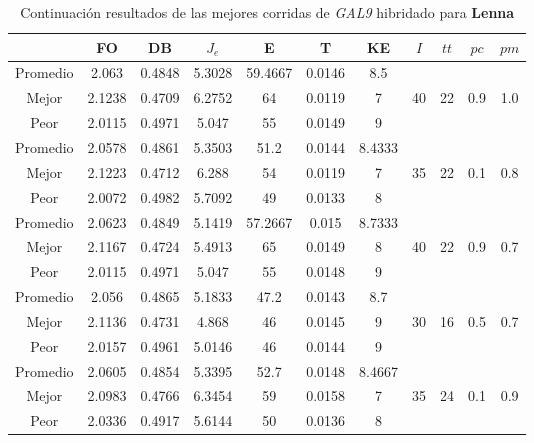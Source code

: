 \begin{table}[h!]
    \footnotesize
    \begin{center}
        \begin{tabular}{|c|c|c|c|c|c|c|c|c|c|c|}
        \hline
             & {\bf FO} & {\bf DB} & $J_e$ & {\bf E} & {\bf T} & {\bf KE} & $I$ & $tt$ & $pc$ & $pm$ \\
        \hline
        \hline
            Promedio  & 2.063 & 0.4848 & 5.3028 & 59.4667 & 0.0146 & 8.5 &  &  &  & \\
            \cline{1-7}
            Mejor & 2.1238 & 0.4709  & 6.2752 & 64 & 0.0119 & 7 & 40 & 22 & 0.9 & 1.0\\
            \cline{1-7}
            Peor & 2.0115 & 0.4971  & 5.047 & 55 & 0.0149 & 9 &  &  &  & \\
        \hline
        \hline
            Promedio  & 2.0578 & 0.4861 & 5.3503 & 51.2 & 0.0144 & 8.4333 &  &  &  & \\
            \cline{1-7}
            Mejor & 2.1223 & 0.4712  & 6.288 & 54 & 0.0119 & 7 & 35 & 22 & 0.1 & 0.8\\
            \cline{1-7}
            Peor & 2.0072 & 0.4982  & 5.7092 & 49 & 0.0133 & 8 &  &  &  & \\
        \hline
        \hline
            Promedio  & 2.0623 & 0.4849 & 5.1419 & 57.2667 & 0.015 & 8.7333 &  &  &  & \\
            \cline{1-7}
            Mejor & 2.1167 & 0.4724  & 5.4913 & 65 & 0.0149 & 8 & 40 & 22 & 0.9 & 0.7\\
            \cline{1-7}
            Peor & 2.0115 & 0.4971  & 5.047 & 55 & 0.0148 & 9 &  &  &  & \\
        \hline
        \hline
            Promedio  & 2.056 & 0.4865 & 5.1833 & 47.2 & 0.0143 & 8.7 &  &  &  & \\
            \cline{1-7}
            Mejor & 2.1136 & 0.4731  & 4.868 & 46 & 0.0145 & 9 & 30 & 16 & 0.5 & 0.7\\
            \cline{1-7}
            Peor & 2.0157 & 0.4961  & 5.0146 & 46 & 0.0144 & 9 &  &  &  & \\
        \hline
        \hline
            Promedio  & 2.0605 & 0.4854 & 5.3395 & 52.7 & 0.0148 & 8.4667 &  &  &  & \\
            \cline{1-7}
            Mejor & 2.0983 & 0.4766  & 6.3454 & 59 & 0.0158 & 7 & 35 & 24 & 0.1 & 0.9\\
            \cline{1-7}
            Peor & 2.0336 & 0.4917  & 5.6144 & 50 & 0.0136 & 8 &  &  &  & \\
        \hline
        \end{tabular}
        \caption{Continuaci\'on resultados de las mejores corridas de \emph{GAL9} hibridado para {\bf Lenna}}
        \label{tb:tablecGAL9}
    \end{center}
\end{table}
